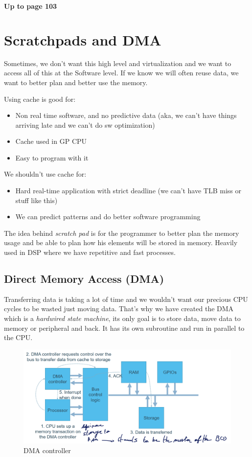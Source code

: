 \documentclass{report}
\begin{document}
\textbf{Up to page 103}

\section{Scratchpads and DMA}

Sometimes, we don't want this high level and virtualization and we want to access all of this at the Software level. If we know we will often reuse data, we want to better plan and better use the memory. 

Using cache is good for:

\begin{itemize}
    \item Non real time software, and no predictive data (aka, we can't have things arriving late and we can't do sw optimization)
    \item Cache used in GP CPU
    \item Easy to program with it
\end{itemize}

We shouldn't use cache for:

\begin{itemize}
    \item Hard real-time application with strict deadline (we can't have TLB miss or stuff like this)
    \item We can predict patterns and do better software programming
\end{itemize}

The idea behind \textit{scratch pad} is for the programmer to better plan the memory usage and be able to plan how his elements will be stored in memory. Heavily used in DSP where we have repetitive and fast processes.

\subsection{Direct Memory Access (DMA)}

Transferring data is taking a lot of time and we wouldn't want our precious CPU cycles to be wasted just moving data. That's why we have created the DMA which is a \textit{hardwired state machine}, its only goal is to store data, move data to memory or peripheral and back. It has its own subroutine and run in parallel to the CPU. 

\begin{figure}[H]
    \centering
    \includegraphics[width=0.75\linewidth]{DMA-controller.png}
    \caption{DMA controller}
    \label{fig:DMA-controller-label}
\end{figure}
\end{document}
